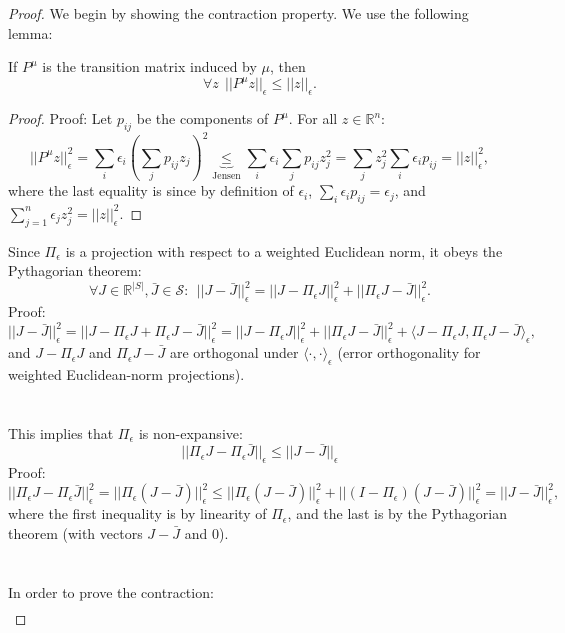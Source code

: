 \begin{proof}
We begin by showing the contraction property. We use the following lemma:
\begin{lemma}\label{lem:P_non_expansion} If $P^\mu$ is the transition matrix induced by $\mu$, then
$$\forall z \ \ ||P^\mu z||_\epsilon \le ||z||_\epsilon.$$
\end{lemma}
\begin{proof}
Proof: Let $p_{ij}$ be the components of $P^\mu$. For all $z \in \mathbb{R}^n$:
$$||P^\mu z||_\epsilon^2 = \sum_i \epsilon_i\left(\sum_j p_{ij}z_j\right)^2 \underbrace{\leq}_{\textrm{Jensen}} \sum_i \epsilon_i \sum_j p_{ij} z_j^2 =  \sum_j z_j^2 \sum_i\epsilon_i p_{ij} = ||z||_\epsilon^2,$$
where the last equality is since by definition of $\epsilon_i$, $\sum_i\epsilon_i p_{ij}  =\epsilon_j$, and
$\sum_{j=1}^n\epsilon_j z_j^2 = ||z||_\epsilon^2.$
\end{proof}
Since $\Pi_\epsilon$ is a projection with respect to a weighted Euclidean norm, it obeys the Pythagorian theorem:
$$\forall J\in \mathbb{R}^{|S|}, \bar{J}\in \mathcal{S}: \ \ ||J-\bar{J}||_\epsilon^2 = ||J-\Pi_\epsilon J||_\epsilon^2 + ||\Pi_\epsilon J - \bar{J}||_\epsilon^2.$$
Proof:
$$||J-\bar{J}||_\epsilon^2 = ||J-\Pi_\epsilon J + \Pi_\epsilon J - \bar{J}||_\epsilon^2 = ||J-\Pi_\epsilon J||_\epsilon^2 + ||\Pi_\epsilon J - \bar{J}||_\epsilon^2 + \langle J-\Pi_\epsilon J, \Pi_\epsilon J - \bar{J}\rangle_\epsilon,$$
and $J-\Pi_\epsilon J$ and $\Pi_\epsilon J-\bar{J}$ are orthogonal under $\langle\cdot,\cdot\rangle_\epsilon$ (error orthogonality for weighted Euclidean-norm projections).
\\
\\
\\
This implies that $\Pi_\epsilon$ is non-expansive:
$$||\Pi_\epsilon J - \Pi_\epsilon \bar{J}||_\epsilon \le ||J-\bar{J}||_\epsilon$$
Proof:
$$||\Pi_\epsilon J - \Pi_\epsilon \bar{J}||_\epsilon^2 = ||\Pi_\epsilon(J-\bar{J})||_\epsilon^2 \le ||\Pi_\epsilon(J-\bar{J})||_\epsilon^2 + ||(I-\Pi_\epsilon)(J-\bar{J})||_\epsilon^2 = ||J-\bar{J}||_\epsilon^2,$$
where the first inequality is by linearity of $\Pi_\epsilon$, and the last is by the Pythagorian theorem (with vectors $J-\bar{J}$ and $0$).
\\
\\
\\
In order to prove the contraction:
\begin{equation*}
\begin{split}

\end{split}
\end{equation*}
\end{proof}
